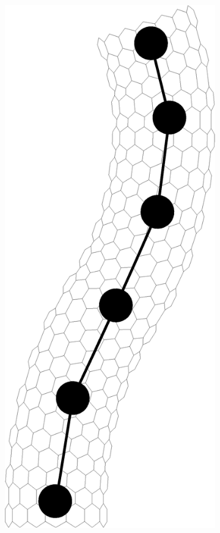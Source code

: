 \begin{figure}[t!]
\begin{subfigure}[t]{.33\textwidth}
			\centering
			\includegraphics[scale=.25]{./old_fig/Nanotube_Coarse_Particle.eps}
			\caption{\label{subfig:NanotubeParticle}}
		\end{subfigure}%
		~		
		\begin{subfigure}[t]{.33\textwidth}

\end{subfigure}
\end{figure}
